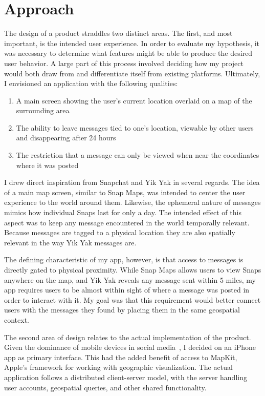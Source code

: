 \section{Approach}

The design of a product straddles two distinct areas. The first, and most important, is the intended user experience. In order to evaluate my hypothesis, it was necessary to determine what features might be able to produce the desired user behavior. A large part of this process involved deciding how my project would both draw from and differentiate itself from existing platforms. Ultimately, I envisioned an application with the following qualities:

\begin{enumerate}
    \item A main screen showing the user's current location overlaid on a map of the surrounding area
    \item The ability to leave messages tied to one's location, viewable by other users and disappearing after 24 hours
    \item The restriction that a message can only be viewed when near the coordinates where it was posted
\end{enumerate}

I drew direct inspiration from Snapchat and Yik Yak in several regards. The idea of a main map screen, similar to Snap Maps, was intended to center the user experience to the world around them. Likewise, the ephemeral nature of messages mimics how individual Snaps last for only a day. The intended effect of this aspect was to keep any message encountered in the world temporally relevant. Because messages are tagged to a physical location they are also spatially relevant in the way Yik Yak messages are.

The defining characteristic of my app, however, is that access to messages is directly gated to physical proximity. While Snap Maps allows users to view Snaps anywhere on the map, and Yik Yak reveals any message sent within 5 miles, my app requires users to be almost within sight of where a message was posted in order to interact with it. My goal was that this requirement would better connect users with the messages they found by placing them in the same geospatial context.

The second area of design relates to the actual implementation of the product. Given the dominance of mobile devices in social media~\cite{umaine_2021}, I decided on an iPhone app as primary interface. This had the added benefit of access to \textsf{MapKit}, Apple's framework for working with geographic visualization. The actual application follows a distributed client-server model, with the server handling user accounts, geospatial queries, and other shared functionality.
